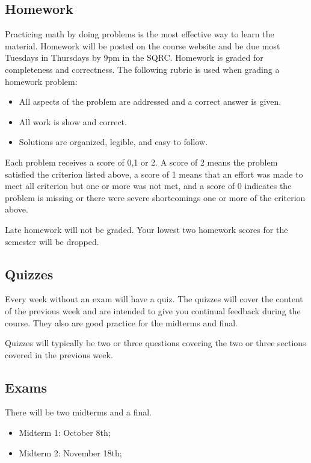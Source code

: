 \documentclass[11pt]{article}
\begin{document}
\subsection*{Homework}

Practicing math by doing problems is the most effective way to learn the material. Homework will be posted on the course website and be due most Tuesdays in Thursdays by 9pm in the SQRC. Homework is graded for completeness and correctness. The following rubric is used when grading a homework problem:
\begin{itemize}\setlength\itemsep{0em}
    \item All aspects of the problem are addressed and a correct answer is given.
    \item All work is show and correct.
    \item Solutions are organized, legible, and easy to follow.
\end{itemize}
Each problem receives a score of 0,1 or 2. A score of 2 means the problem satisfied the criterion listed above, a score of 1 means that an effort was made to meet all criterion but one or more was not met, and a score of 0 indicates the problem is missing or there were severe shortcomings one or more of the criterion above.

Late homework will not be graded. Your lowest two homework scores for the semester will be dropped.

\subsection*{Quizzes}

Every week without an exam will have a quiz. The quizzes will cover the content of the previous week and are intended to give you continual feedback during the course. They also are good practice for the midterms and final.

Quizzes will typically be two or three questions covering the two or three sections covered in the previous week.

\subsection*{Exams}

There will be two midterms and a final.

\begin{itemize}
  \item Midterm 1: October 8th;
  \item Midterm 2: November 18th;
\end{itemize}
\end{document}
